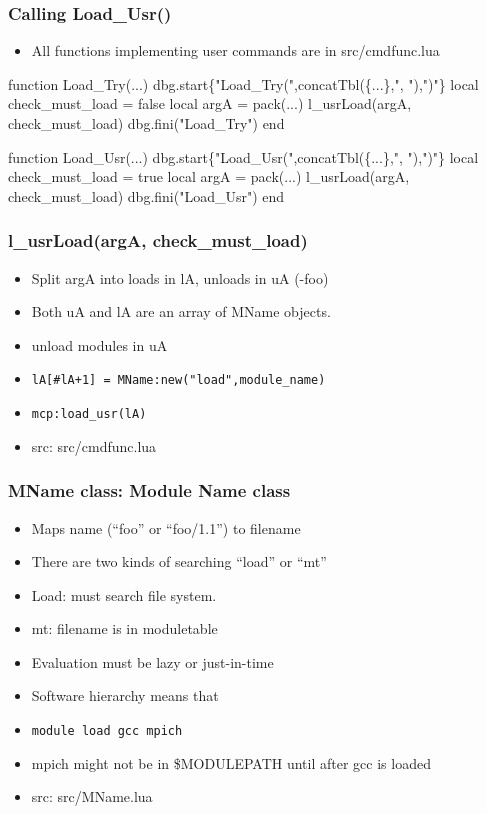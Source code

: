 \documentclass{beamer}
\begin{document}
\begin{frame}[fragile]
    \frametitle{Calling Load\_Usr()}
  \begin{itemize}
    \item All functions implementing user commands are in src/cmdfunc.lua
  \end{itemize}

 {\tiny
    \begin{semiverbatim}
function Load\_Try(...)
   dbg.start\{"Load\_Try(",concatTbl(\{...\},", "),")"\}
   local check\_must\_load = false
   local argA            = pack(...)
   l\_usrLoad(argA, check\_must\_load)
   dbg.fini("Load\_Try")
end

function Load\_Usr(...)
   dbg.start\{"Load\_Usr(",concatTbl(\{...\},", "),")"\}
   local check\_must\_load = true
   local argA            = pack(...)
   l\_usrLoad(argA, check\_must\_load)
   dbg.fini("Load\_Usr")
end
    \end{semiverbatim}
}
\end{frame}

\begin{frame}[fragile]
    \frametitle{l\_usrLoad(argA, check\_must\_load)}
  \begin{itemize}
    \item Split argA into loads in lA, unloads in uA (-foo)
    \item Both uA and lA are an array of MName objects.
    \item unload modules in uA 
    \item {\color{blue} \texttt{lA[\#lA+1] = MName:new("load",module\_name)}}
    \item {\color{blue} \texttt{mcp:load\_usr(lA)}}
    \item src: src/cmdfunc.lua
  \end{itemize}
\end{frame}

\begin{frame}[fragile]
    \frametitle{MName class: Module Name class}
 {\tiny
    \begin{semiverbatim}
    \end{semiverbatim}
}
  \begin{itemize}
    \item Maps name (``foo'' or ``foo/1.1'') to filename
    \item There are two kinds of searching ``load'' or ``mt''
    \item Load: must search file system. 
    \item mt: filename is in moduletable
    \item Evaluation must be lazy or just-in-time
    \item Software hierarchy means that 
    \item {\color{blue}\texttt{module load gcc mpich}}
    \item mpich might not be in \$MODULEPATH until after gcc is loaded
    \item src: src/MName.lua
  \end{itemize}

\end{frame}
\end{document}
